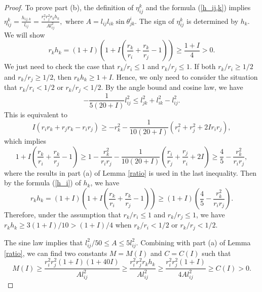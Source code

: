 \documentclass[12pt]{amsart}
\begin{document}
\begin{proof}
	To prove part (b), the definition of $\eta_{ij}^k$ and the formula (\ref{h_ij,k}) implies
	$\eta_{ij}^k = \frac{h_{ij,k}}{l_{ij}} = \frac{r_i^2r_j^2r_kh_k}{Al^2_{ij}},$
	where $A=l_{ij}l_{ik}\sin \theta^i_{jk}$. The sign of $\eta_{ij}^k$ is determined by $h_k$. We will show
	\begin{equation}
	\label{radius}
	    	r_kh_k = (1+I)(1 + I(\frac{r_k}{r_i} +\frac{r_k}{r_j} - 1))\geq \frac{1+I}{4}>0.
	\end{equation}
	We just need to check the case that $r_k/r_i\leq 1$ and $r_k/r_j\leq 1$.  If both $r_k/r_i\geq 1/2$ and $r_k/r_j\geq 1/2$, then $r_kh_k\geq 1+I$. Hence, we only need to consider the situation that  $r_k/r_i<1/2$ or $r_k/r_j<1/2$. By the angle bound and cosine law, we have
	$$-\frac{1}{5(20+I)}l_{ij}^2 \leq l_{jk}^2 + l_{ik}^2 -l_{ij}^2 .$$
	This is equivalent to
		$$I(r_ir_k + r_jr_k - r_ir_j ) \geq - r_k^2 - \frac{1}{10(20+I)}(r_i^2 + r_j^2 + 2Ir_ir_j),$$
which implies
	 $$1 + I(\frac{r_k}{r_i} +\frac{r_k}{r_j} - 1) \geq 1 - \frac{r_k^2}{r_ir_j} - \frac{1}{10(20+I)}(\frac{r_i}{r_j} + \frac{r_j}{r_i} + 2I) \geq \frac{4}{5} - \frac{r_k^2}{r_ir_j},$$
where the results in part (a) of Lemma \ref{ratio} is used in the last inequality.
	Then by the formula (\ref{h_i}) of $h_k$, we have
	$$r_kh_k = (1+I)(1 + I(\frac{r_k}{r_i} +\frac{r_k}{r_j} - 1)) \geq (1+I)(\frac{4}{5} - \frac{r_k^2}{r_ir_j}).$$
	 Therefore, under the assumption that $r_k/r_i\leq 1$ and $r_k/r_j\leq 1$, we have $r_kh_k\geq 3(1+I)/10> (1+I)/4$ when  $r_k/r_i<1/2$ or $r_k/r_j<1/2$.

	The sine law implies that $l_{ij}^2/50\leq A\leq 5l_{ij}^2$. Combining with part (a) of Lemma \ref{ratio}, we can find two constants $M=M(I)$ and $C=C(I)$ such that
	$$M(I) \geq \frac{r_i^2r_j^2 (1+I)(1+40I)}{Al^2_{ij}}\geq \frac{r_i^2r_j^2r_kh_k}{Al^2_{ij}}\geq \frac{r_i^2r_j^2 (1+I)}{4Al^2_{ij}} \geq C(I) > 0.$$ \end{proof}
\end{document}

